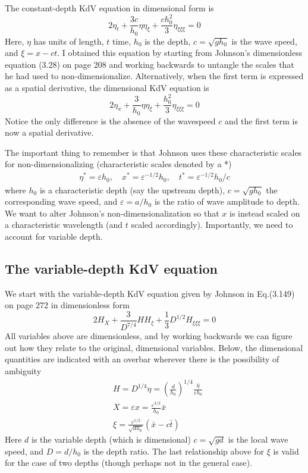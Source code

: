 \documentclass[12pt]{article}
\newcommand{\eps}{\varepsilon}
\begin{document}
The constant-depth KdV equation in dimensional form is
\begin{equation}
2 \eta_t + \frac{3 c}{h_0} \eta \eta_{\xi} + \frac{c h_0^2}{3} \eta_{\xi \xi \xi} = 0
\end{equation}
Here, $\eta$ has units of length, $t$ time, $h_0$ is the depth, $c = \sqrt{g h_0}$ is the wave speed, and $\xi = x - ct$. I obtained this equation by starting from Johnson's dimensionless equation (3.28) on page 208 and working backwards to untangle the scales that he had used to non-dimensionalize.
Alternatively, when the first term is expressed as a spatial derivative, the dimensional KdV equation is
\begin{equation}
2 \eta_x + \frac{3}{h_0} \eta \eta_{\xi} + \frac{h_0^2}{3} \eta_{\xi \xi \xi} = 0
\end{equation}
Notice the only difference is the absence of the wavespeed $c$ and the first term is now a spatial derivative.

The important thing to remember is that Johnson uses these characteristic scales for non-dimensionalizing (characteristic scales denoted by a *)
\begin{align}
\eta^* = \eps h_0 , \quad
x^* = \eps^{-1/2} h_0 , \quad
t^* = \eps^{-1/2} h_0/c
\end{align}
where $h_0$ is a characteristic depth (say the upstream depth), $c = \sqrt{g h_0}$ the corresponding wave speed, and $\eps = a / h_0$ is the ratio of wave amplitude to depth. We want to alter Johnson's non-dimensionalization so that $x$ is instead scaled on a characteristic wavelength (and $t$ scaled accordingly). Importantly, we need to account for variable depth.


\subsection{The variable-depth KdV equation}

We start with the variable-depth KdV equation given by Johnson in Eq.(3.149) on page 272 in dimensionless form 
\begin{equation}
\label{varKdVJohnson}
2 H_X + \frac{3}{D^{7/4}} H H_\xi + \frac{1}{3} D^{1/2} H_{\xi \xi \xi} = 0
\end{equation}
All variables above are dimensionless, and by working backwards we can figure out how they relate to the original, dimensional variables. Below, the dimensional quantities are indicated with an overbar wherever there is the possibility of ambiguity
\begin{align}
& H = D^{1/4} \eta = \left( \frac{d}{h_0} \right)^{1/4} \frac{\bar{\eta}}{\eps h_0} \\
& X = \eps x = \frac{\eps^{3/2}}{h_0} \bar{x} \\
& \xi = \frac{\eps^{1/2}}{\sqrt{d h_0}} (\bar{x} - c \bar{t})
\end{align}
Here $d$ is the variable depth (which is dimensional) $c = \sqrt{g d}$ is the local wave speed, and $D = d/h_0$ is the depth ratio. The last relationship above for $\xi$ is valid for the case of two depths (though perhaps not in the general case).
\end{document}
